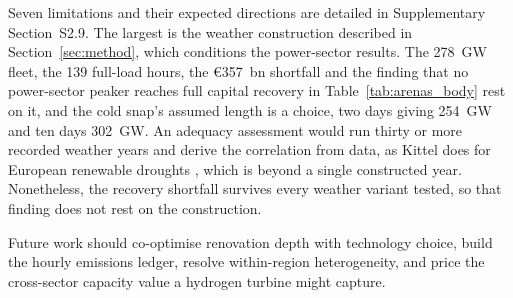 Seven limitations and their expected directions are detailed in Supplementary
Section~S2.9. The largest is the weather construction described in
Section~\ref{sec:method}, which conditions the power-sector results. The 278~GW fleet, the
139 full-load hours, the \euro{}357~bn shortfall and the finding that no power-sector
peaker reaches full capital recovery in Table~\ref{tab:arenas_body} rest on it, and the
cold snap's assumed length is a choice,
two days giving 254~GW and ten days 302~GW. An adequacy assessment would run thirty or more recorded weather years and derive the correlation from data, as Kittel \citep{Kittel2026Dunkelflaute} does for European renewable droughts \citep{Staffell2016Wind,Pfenninger2016Solar}, which is beyond a single constructed year. Nonetheless, the recovery shortfall survives every weather variant tested, so that finding does not rest on the construction.

Future work should co-optimise renovation depth with technology choice, build the hourly emissions ledger, resolve within-region heterogeneity, and price the cross-sector capacity value a hydrogen turbine might capture. 
